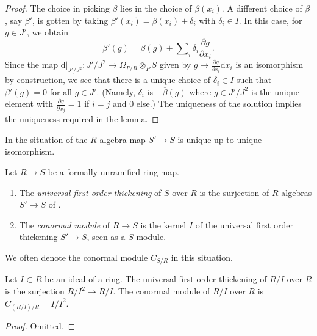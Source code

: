 \begin{proof}
The choice in picking $\beta$ lies in the choice of $\beta(x_i)$.
A different choice of $\beta$, say $\beta'$, is gotten by taking
$\beta'(x_i) = \beta(x_i) + \delta_i$ with $\delta_i \in I$.
In this case, for $g \in J'$, we obtain
$$
\beta'(g) =
\beta(g) + \sum\nolimits_i \delta_i \frac{\partial g}{\partial x_i}.
$$
Since the map $\text{d}|_{J'/J^2} : J'/J^2 \to \Omega_{P/R} \otimes_P S$
given by $g \mapsto \frac{\partial g}{\partial x_i}\text{d}x_i$
is an isomorphism by construction, we see that there is a unique choice
of $\delta_i \in I$ such that $\beta'(g) = 0$ for all $g \in J'$.
(Namely, $\delta_i$ is $-\overline{\beta}(g)$ where $g \in J'/J^2$
is the unique element with $\frac{\partial g}{\partial x_j} = 1$ if
$i = j$ and $0$ else.) The uniqueness of the solution implies the
uniqueness required in the lemma.
\end{proof}

\noindent
In the situation of
the $R$-algebra map $S' \to S$ is unique up to unique isomorphism.

\begin{definition}
\label{definition-universal-thickening}
Let $R \to S$ be a formally unramified ring map.
\begin{enumerate}
\item The {\it universal first order thickening} of $S$ over $R$ is
the surjection of $R$-algebras $S' \to S$ of
.
\item The {\it conormal module} of $R \to S$ is the kernel $I$ of the
universal first order thickening $S' \to S$, seen as a $S$-module.
\end{enumerate}
We often denote the conormal module {\it $C_{S/R}$} in this situation.
\end{definition}

\begin{lemma}
\label{lemma-universal-thickening-quotient}
Let $I \subset R$ be an ideal of a ring.
The universal first order thickening of $R/I$ over $R$
is the surjection $R/I^2 \to R/I$. The conormal module
of $R/I$ over $R$ is $C_{(R/I)/R} = I/I^2$.
\end{lemma}

\begin{proof}
Omitted.
\end{proof}

